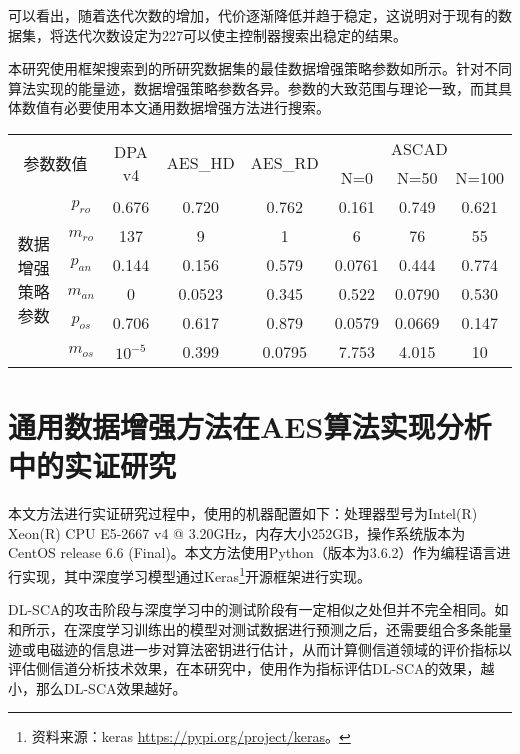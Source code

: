 {	可以看出，随着迭代次数的增加，代价逐渐降低并趋于稳定，这说明对于现有的数据集，将迭代次数设定为227可以使主控制器搜索出稳定的结果。
	
	本研究使用框架搜索到的所研究数据集的最佳数据增强策略参数如所示。针对不同算法实现的能量迹，数据增强策略参数各异。参数的大致范围与理论一致，而其具体数值有必要使用本文通用数据增强方法进行搜索。
	
	\begin{table}[!h]
		\label{tab:paras}
		\centering
		\small 
		\begin{tabular}{cc|cccccc}
			\hline
			\multicolumn{2}{c|}{\multirow{2}{*}{参数数值}} &\multirow{2}{*}{DPA v4}&\multirow{2}{*}{AES\_HD}&\multirow{2}{*}{AES\_RD}& \multicolumn{3}{c}{ASCAD} \\
			\multicolumn{2}{c|}{}&&&&N=0 & N=50 & N=100 \\
			\hline
			\multirow{6}{*}{数据增强策略参数}
			&$p_{ro}$&0.676&0.720&0.762&0.161&0.749&0.621\\
			&$m_{ro}$&137&9&1&6&76&55\\
			&$p_{an}$&0.144&0.156&0.579&0.0761&0.444&0.774\\
			&$m_{an}$&   0&0.0523&0.345&0.522&0.0790&0.530\\
			&$p_{os}$&0.706&0.617&0.879&0.0579&0.0669&0.147\\
			&$m_{os}$&$10^{-5}$&0.399&0.0795&7.753&4.015&10\\
			\hline
			
		\end{tabular}   
	\end{table}

	\section{通用数据增强方法在AES算法实现分析中的实证研究}\label{sec:realexp}
	
	本文方法进行实证研究过程中，使用的机器配置如下：处理器型号为Intel(R) Xeon(R) CPU E5-2667 v4 @ 3.20GHz，内存大小252GB，操作系统版本为CentOS release 6.6 (Final)。本文方法使用Python（版本为3.6.2）作为编程语言进行实现，其中深度学习模型通过Keras\footnote{资料来源：keras \href{https://pypi.org/project/keras}{https://pypi.org/project/keras}。}开源框架进行实现。

	DL-SCA的攻击阶段与深度学习中的测试阶段有一定相似之处但并不完全相同。如和所示，在深度学习训练出的模型对测试数据进行预测之后，还需要组合多条能量迹或电磁迹的信息进一步对算法密钥进行估计，从而计算侧信道领域的评价指标以评估侧信道分析技术效果，在本研究中，使用\chenggongtiaoshu 作为指标评估DL-SCA的效果，\chenggongtiaoshu 越小，那么DL-SCA效果越好。

}
